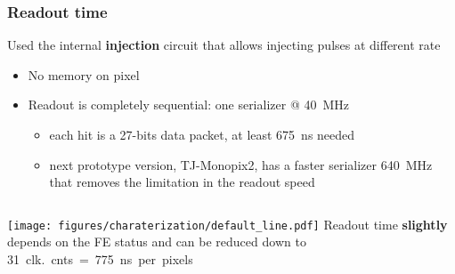     \begin{frame}
        \frametitle{Readout time}
        Used the internal \textbf{injection} circuit that allows injecting pulses at different rate 
        \begin{itemize}
            \item No memory on pixel
            \item Readout is completely sequential: one serializer @ \SI{40}{MHz}
            \begin{itemize}
                \item each hit is a 27-bits data packet, at least \SI{675}{ns} needed 
                \item next prototype version, TJ-Monopix2, has a faster serializer \SI{640}{MHz} that removes the limitation in the readout speed 
            \end{itemize}
        \end{itemize}

        \medskip
        \begin{columns}
                \texttt{[image: figures/charaterization/default\_line.pdf]}
            Readout time \textbf{slightly} depends on the FE status and can be reduced down to \SI{31}{clk.}cnts = \SI{775}{ns} per pixels 

        \end{columns}            
    \end{frame}          